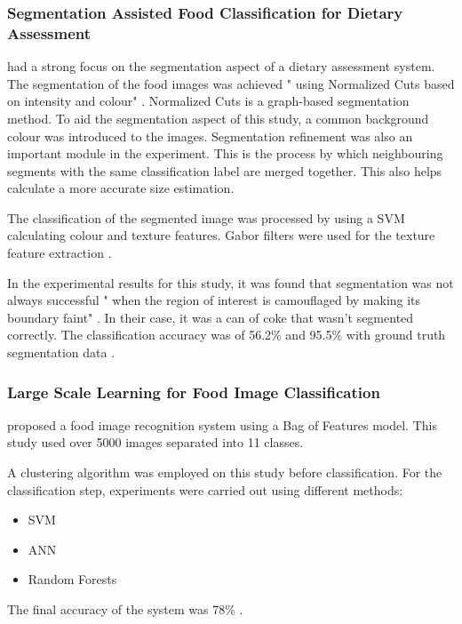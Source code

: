 \subsubsection*{Segmentation Assisted Food Classification for Dietary Assessment}
\parencite{zhu2011segmentation} had a strong focus on the segmentation aspect of a dietary assessment system.
The segmentation of the food images was achieved " using Normalized Cuts based on intensity and colour" \parencite{zhu2011segmentation}.
Normalized Cuts is a graph-based segmentation method.
To aid the segmentation aspect of this study, a common background colour was introduced to the images.
Segmentation refinement was also an important module in the experiment.
This is the process by which neighbouring segments with  the same classification label are merged together.
This also helps calculate a more accurate size estimation.

The classification of the segmented image was processed by using a SVM calculating colour and texture features.
Gabor filters were used for the texture feature extraction \parencite{zhu2011segmentation}.

In the experimental results for this study, it was found that segmentation was not always successful " when the region of interest is camouflaged by making its boundary faint" \parencite{zhu2011segmentation}. In their case, it was a can of coke that wasn't segmented correctly.
The classification accuracy was of 56.2\% and 95.5\% with ground truth segmentation data \parencite{zhu2011segmentation}.

\subsubsection*{Large Scale Learning for Food Image Classification}
\parencite{LSL_2015} proposed a food image recognition system using a Bag of Features model.
This study used over 5000 images separated into 11 classes.

A clustering algorithm was employed on this study before classification.
For the classification step, experiments were carried out using different methods:
\begin{itemize}
	\item{SVM}
	\item{ANN}
	\item{Random Forests}
\end{itemize}

The final accuracy of the system was 78\% \parencite{LSL_2015}.

